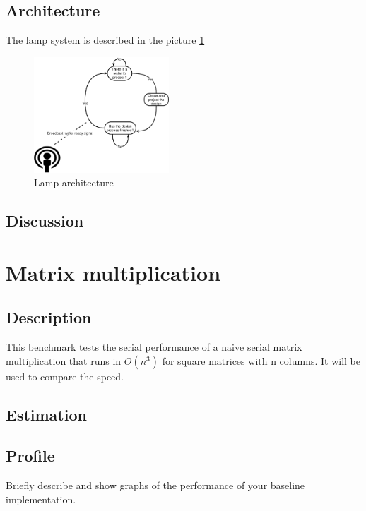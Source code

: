 \documentclass[twocolumn]{article}
\begin{document}
\subsection{Architecture}
The lamp system is described in the picture \ref{fig:Lamp_architecture}
\begin{figure}[h]
    \centering
    \includegraphics[width=0.45\textwidth]{lamp.pdf}
    \caption{Lamp architecture}
    \label{fig:Lamp_architecture}
\end{figure}
\subsection{Discussion}


\section{Matrix multiplication}
\subsection{Description}
This benchmark tests the serial performance of a naive serial matrix multiplication that runs in $O(n^3)$ for square matrices with n columns. It will be used to compare the speed.

\subsection{Estimation}

\subsection{Profile}
Briefly describe and show graphs of the performance of your baseline implementation.
\end{document}

